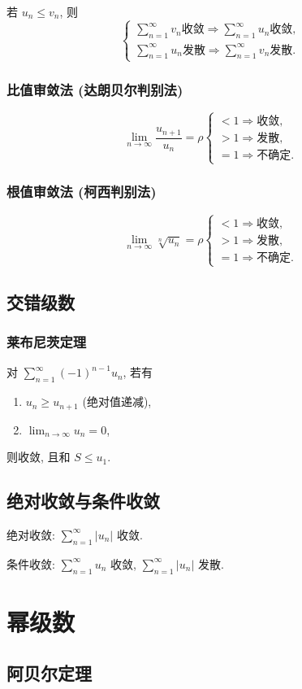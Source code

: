 若 $u_n \leq v_n$, 则
$$
    \begin{cases}
        \sum_{n=1}^\infty v_n \mbox{收敛} \Longrightarrow \sum_{n=1}^\infty u_n \mbox{收敛}, \\
        \sum_{n=1}^\infty u_n \mbox{发散} \Longrightarrow \sum_{n=1}^\infty v_n \mbox{发散}.
    \end{cases}
$$

\subsubsection{比值审敛法 (达朗贝尔判别法)}

$$
    \lim_{n\to\infty} \frac{u_{n+1}}{u_{n}} = \rho
    \begin{cases}
        < 1 \Longrightarrow \mbox{收敛}, \\
        > 1 \Longrightarrow \mbox{发散}, \\
        = 1 \Longrightarrow \mbox{不确定}.
    \end{cases}
$$

\subsubsection{根值审敛法 (柯西判别法)}

$$
    \lim_{n\to\infty} \sqrt[n]{u_n} = \rho
    \begin{cases}
        < 1 \Longrightarrow \mbox{收敛}, \\
        > 1 \Longrightarrow \mbox{发散}, \\
        = 1 \Longrightarrow \mbox{不确定}.
    \end{cases}
$$

\subsection{交错级数}

\subsubsection{莱布尼茨定理}

对 $\sum_{n=1}^{\infty}(-1)^{n-1} u_{n}$, 若有

\begin{enumerate}
    \item $u_n \geq u_{n+1}$ (绝对值递减),
    \item $\lim _{n \rightarrow \infty} u_{n}=0$,
\end{enumerate}

则收敛, 且和 $S \leq u_1$.

\subsection{绝对收敛与条件收敛}

绝对收敛: $\sum_{n=1}^{\infty} |u_n|$ 收敛.

条件收敛: $\sum_{n=1}^{\infty} u_n$ 收敛, $\sum_{n=1}^{\infty} |u_n|$ 发散.

\section{幂级数}

\subsection{阿贝尔定理}
